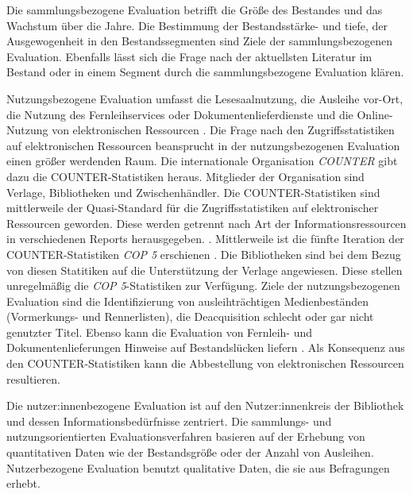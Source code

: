 Die sammlungsbezogene Evaluation betrifft die Größe des Bestandes und das Wachstum über die Jahre. Die Bestimmung der Bestandsstärke- und tiefe, 
der Ausgewogenheit in den Bestandssegmenten sind Ziele der sammlungsbezogenen Evaluation. 
Ebenfalls lässt sich die Frage nach der aktuellsten Literatur im Bestand oder in einem Segment durch die sammlungsbezogene Evaluation klären.

Nutzungsbezogene Evaluation umfasst die Lesesaalnutzung, die Ausleihe vor-Ort, die Nutzung des Fernleihservices oder Dokumentenlieferdienste und die Online-Nutzung von elektronischen Ressourcen \cite[Vgl.][254 ff.]{johannsen_jochen_bestands-_2015}.
Die Frage nach den Zugriffsstatistiken auf elektronischen Ressourcen beansprucht in der nutzungsbezogenen Evaluation einen größer werdenden Raum.
Die internationale Organisation \textit{\acrfull{COUNTER}} gibt dazu die COUNTER-Statistiken heraus. Mitglieder der Organisation sind Verlage, Bibliotheken
und Zwischenhändler. Die COUNTER-Statistiken sind mittlerweile der Quasi-Standard für die Zugriffsstatistiken 
auf elektronischer Ressourcen geworden. Diese werden getrennt nach Art der Informationsressourcen in verschiedenen Reports herausgegeben. \cite[Vgl.][260 ff.]{johannsen_jochen_bestands-_2015}. 
Mittlerweile ist die fünfte Iteration der COUNTER-Statistiken \textit{\acrshort{COP 5}} erschienen \cite[Vgl.][]{counter_abstract_2020}.
Die Bibliotheken sind bei dem Bezug von diesen Statitiken auf die Unterstützung der Verlage angewiesen. Diese stellen unregelmäßig die \textit{\acrshort{COP 5}}-Statistiken zur
Verfügung. Ziele der nutzungsbezogenen Evaluation sind die Identifizierung von ausleihträchtigen Medienbeständen (Vormerkungs- und Rennerlisten), 
die Deacquisition schlecht oder gar nicht genutzter Titel. Ebenso kann die Evaluation von Fernleih- und Dokumentenlieferungen Hinweise auf Bestandslücken liefern
\cite[Vgl.][255 ff.]{johannsen_jochen_bestands-_2015}. Als Konsequenz aus den COUNTER-Statistiken kann die Abbestellung von elektronischen Ressourcen resultieren.

Die nutzer:innenbezogene Evaluation ist auf den Nutzer:innenkreis der Bibliothek und dessen Informationsbedürfnisse zentriert. 
Die sammlungs- und nutzungsorientierten Evaluationsverfahren basieren auf der Erhebung von quantitativen Daten wie der Bestandsgröße oder der Anzahl von Ausleihen. 
Nutzerbezogene Evaluation benutzt qualitative Daten, die sie aus Befragungen erhebt.

